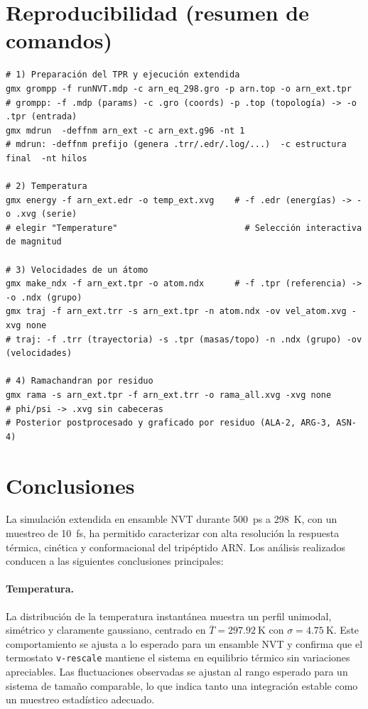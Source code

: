 \documentclass[12pt,a4paper]{article}
\begin{document}
\section{Reproducibilidad (resumen de comandos)}
\begin{lstlisting}
# 1) Preparación del TPR y ejecución extendida
gmx grompp -f runNVT.mdp -c arn_eq_298.gro -p arn.top -o arn_ext.tpr
# grompp: -f .mdp (params) -c .gro (coords) -p .top (topología) -> -o .tpr (entrada)
gmx mdrun  -deffnm arn_ext -c arn_ext.g96 -nt 1
# mdrun: -deffnm prefijo (genera .trr/.edr/.log/...)  -c estructura final  -nt hilos

# 2) Temperatura
gmx energy -f arn_ext.edr -o temp_ext.xvg    # -f .edr (energías) -> -o .xvg (serie)
# elegir "Temperature"                         # Selección interactiva de magnitud

# 3) Velocidades de un átomo
gmx make_ndx -f arn_ext.tpr -o atom.ndx      # -f .tpr (referencia) -> -o .ndx (grupo)
gmx traj -f arn_ext.trr -s arn_ext.tpr -n atom.ndx -ov vel_atom.xvg -xvg none
# traj: -f .trr (trayectoria) -s .tpr (masas/topo) -n .ndx (grupo) -ov (velocidades)

# 4) Ramachandran por residuo
gmx rama -s arn_ext.tpr -f arn_ext.trr -o rama_all.xvg -xvg none     
# phi/psi -> .xvg sin cabeceras
# Posterior postprocesado y graficado por residuo (ALA-2, ARG-3, ASN-4)
\end{lstlisting}

\section{Conclusiones}

La simulación extendida en ensamble NVT durante \SI{500}{ps} a \SI{298}{K}, con un muestreo de \SI{10}{fs}, ha permitido caracterizar con alta resolución la respuesta térmica, cinética y conformacional del tripéptido ARN. Los análisis realizados conducen a las siguientes conclusiones principales:

\paragraph{Temperatura.}
La distribución de la temperatura instantánea muestra un perfil unimodal, simétrico y claramente gaussiano, centrado en \(\overline{T}=297.92~\text{K}\) con \(\sigma=4.75~\text{K}\). Este comportamiento se ajusta a lo esperado para un ensamble NVT y confirma que el termostato \texttt{v-rescale} mantiene el sistema en equilibrio térmico sin variaciones apreciables. Las fluctuaciones observadas se ajustan al rango esperado para un sistema de tamaño comparable, lo que indica tanto una integración estable como un muestreo estadístico adecuado.
\end{document}
